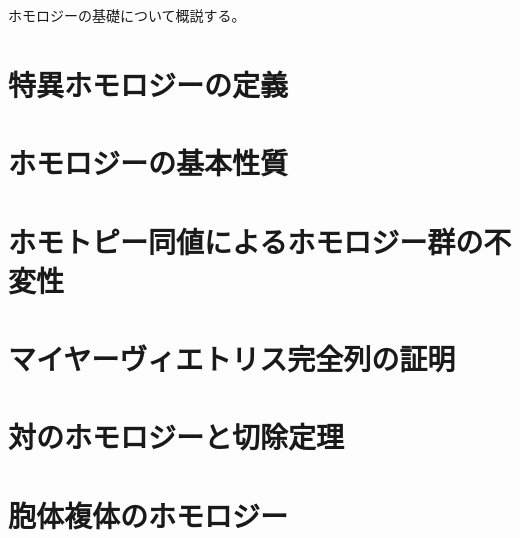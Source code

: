 \documentclass{ujarticle}
\begin{document}
ホモロジーの基礎について概説する。

\section{特異ホモロジーの定義}
\label{sec:特異ホモロジーの定義}

\section{ホモロジーの基本性質}
\label{sec:ホモロジーの基本性質}

\section{ホモトピー同値によるホモロジー群の不変性}
\label{sec:ホモトピー同値によるホモロジー群の不変性}

\section{マイヤーヴィエトリス完全列の証明}
\label{sec:マイヤーヴィエトリス完全列の証明}

\section{対のホモロジーと切除定理}
\label{sec:対のホモロジーと切除定理}

\section{胞体複体のホモロジー}
\label{sec:section label}
\end{document}

